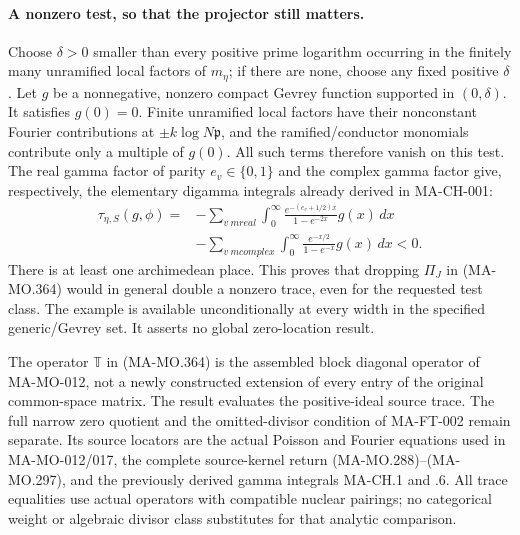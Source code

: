 \paragraph{A nonzero test, so that the projector still matters.}
Choose \(\delta>0\) smaller than every positive prime logarithm
occurring in the finitely many unramified local factors of
\(m_\eta\); if there are none, choose any fixed positive
\(\delta\).  Let \(g\) be a nonnegative, nonzero compact
Gevrey function supported in \((0,\delta)\).  It satisfies
\(g(0)=0\).  Finite unramified local factors have their
nonconstant Fourier contributions at
\(\pm k\log N\mathfrak p\), and the ramified/conductor
monomials contribute only a multiple of \(g(0)\).  All
such terms therefore vanish on this test.  The real gamma
factor of parity \(e_v\in\{0,1\}\) and the complex gamma
factor give, respectively, the elementary digamma integrals
already derived in MA-CH-001:
\[
 \begin{aligned}
 \tau_{\eta,S}(g,\phi)
  ={}&-\sum_{v\ {
m real}}\int_0^\infty
       \frac{e^{-(e_v+1/2)x}}{1-e^{-2x}}g(x)\,dx\\
     &-\sum_{v\ {
m complex}}\int_0^\infty
       \frac{e^{-x/2}}{1-e^{-x}}g(x)\,dx<0.
 \end{aligned}
 \tag{MA-MO.369}
\]
There is at least one archimedean place.  This proves that
dropping \(\Pi_J\) in (MA-MO.364) would in general double a
nonzero trace, even for the requested test class.  The
example is available unconditionally at every width in the
specified generic/Gevrey set.  It asserts no global
zero-location result.

The operator \(\mathbb T\) in (MA-MO.364) is the assembled
block diagonal operator of MA-MO-012, not a newly constructed
extension of every entry of the original common-space matrix.
The result evaluates the positive-ideal source trace.  The
full narrow zero quotient and the omitted-divisor condition
of MA-FT-002 remain separate.  Its source locators are the
actual Poisson and Fourier equations used in MA-MO-012/017,
the complete source-kernel return (MA-MO.288)--(MA-MO.297),
and the previously derived gamma integrals MA-CH.1 and .6.
All trace equalities use actual operators with compatible
nuclear pairings; no categorical weight or algebraic divisor
class substitutes for that analytic comparison.
